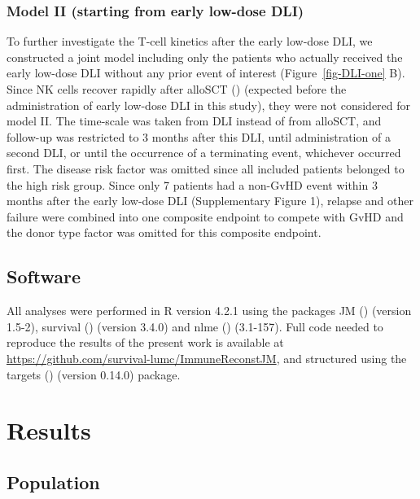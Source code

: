 \documentclass[
  letterpaper,
  DIV=11,
  numbers=noendperiod]{scrreprt}
\begin{document}
\subsubsection{Model II (starting from early low-dose
DLI)}\label{model-ii-starting-from-early-low-dose-dli}

To further investigate the T-cell kinetics after the early low-dose DLI,
we constructed a joint model including only the patients who actually
received the early low-dose DLI without any prior event of interest
(Figure~\ref{fig-DLI-one} B). Since NK cells recover rapidly after
alloSCT () (expected before the administration of early
low-dose DLI in this study), they were not considered for model II. The
time-scale was taken from DLI instead of from alloSCT, and follow-up was
restricted to 3 months after this DLI, until administration of a second
DLI, or until the occurrence of a terminating event, whichever occurred
first. The disease risk factor was omitted since all included patients
belonged to the high risk group. Since only 7 patients had a non-GvHD
event within 3 months after the early low-dose DLI (Supplementary Figure
1), relapse and other failure were combined into one composite endpoint
to compete with GvHD and the donor type factor was omitted for this
composite endpoint.

\subsection{Software}\label{software-2}

All analyses were performed in R version 4.2.1 using the packages JM
() (version
1.5-2), survival ()
(version 3.4.0) and nlme
() (3.1-157). Full code needed to reproduce the results of the
present work is available at
\url{https://github.com/survival-lumc/ImmuneReconstJM}, and structured
using the targets
() (version
0.14.0) package.

\section{Results}\label{results-3}

\subsection{Population}\label{population}
\end{document}
